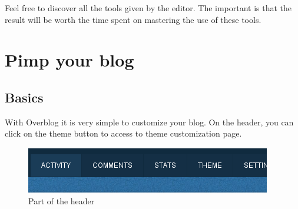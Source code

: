 \documentclass[a4paper,10pt]{article}
\begin{document}
Feel free to discover all the tools given by the editor. The important is that the result will be worth the time spent on mastering the use of these tools. 

\newpage

\section{Pimp your blog}
\subsection{Basics}
With Overblog it is very simple to customize your blog. On the header, you can click on the theme button to access to theme customization page.
\begin{figure}[htpb]
 \centering
 \includegraphics[scale=0.43]{Images/HeaderBar.png}
 \caption{Part of the header}
 \label{customHeader}
\end{figure}
\end{document}
